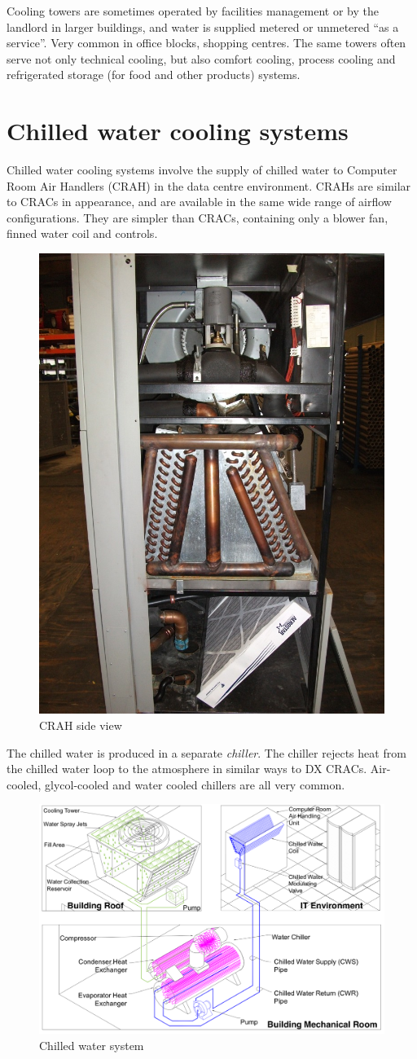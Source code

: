\documentclass{pgnotes}
\begin{document}
Cooling towers are sometimes operated by facilities management or by the landlord in larger buildings, and water is supplied metered or unmetered ``as a service''.
Very common in office blocks, shopping centres. 
The same towers often serve not only technical cooling, but also comfort cooling, process cooling and refrigerated storage (for food and other products) systems.

\section{Chilled water cooling systems}

Chilled water cooling systems involve the supply of chilled water to Computer Room Air Handlers (CRAH) in the data centre environment.
CRAHs are similar to CRACs in appearance, and are available in the same wide range of airflow configurations.
They are simpler than CRACs, containing only a blower fan, finned water coil and controls.

\begin{figure}[htbp]
  \centering
  \includegraphics[width=0.3\linewidth]{crah_side_view}
  \caption{CRAH side view}
  \label{fig:crah-side-view}
\end{figure}

The chilled water is produced in a separate \textit{chiller}.
The chiller rejects heat from the chilled water loop to the atmosphere in similar ways to DX CRACs.
Air-cooled, glycol-cooled and water cooled chillers are all very common.

\begin{figure}[htbp]
  \centering
  \includegraphics[width=1.0\linewidth]{chilled_water_system_water_cooled}
  \caption{Chilled water system}
  \label{fig:chilled-water-system-water-cooled}
\end{figure}
\end{document}
